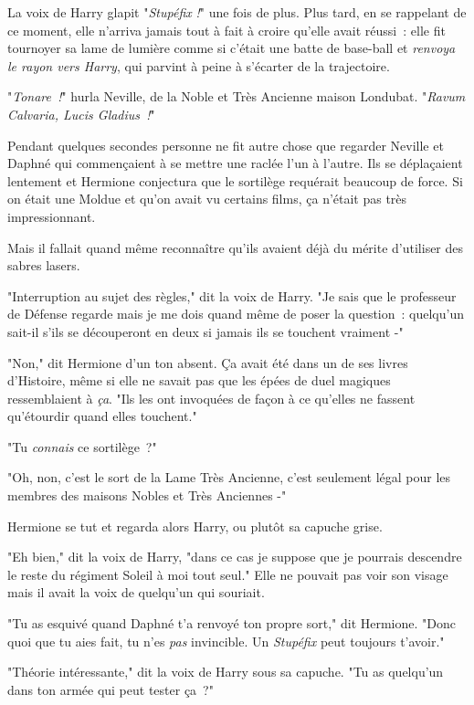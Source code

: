 La voix de Harry glapit "\emph{Stupéfix} \emph{!}" une fois de plus. Plus tard, en se rappelant de ce moment, elle n'arriva jamais tout à fait à croire qu'elle avait réussi~: elle fit tournoyer sa lame de lumière comme si c'était une batte de base-ball et \emph{renvoya le rayon vers Harry}, qui parvint à peine à s'écarter de la trajectoire.

"\emph{Tonare~!}" hurla Neville, de la Noble et Très Ancienne maison Londubat. "\emph{Ravum Calvaria, Lucis Gladius~!}"

\later

Pendant quelques secondes personne ne fit autre chose que regarder Neville et Daphné qui commençaient à se mettre une raclée l'un à l'autre. Ils se déplaçaient lentement et Hermione conjectura que le sortilège requérait beaucoup de force. Si on était une Moldue et qu'on avait vu certains films, ça n'était pas très impressionnant.

Mais il fallait quand même reconnaître qu'ils avaient déjà du mérite d'utiliser des sabres lasers.

"Interruption au sujet des règles," dit la voix de Harry. "Je sais que le professeur de Défense regarde mais je me dois quand même de poser la question~: quelqu'un sait-il s'ils se découperont en deux si jamais ils se touchent vraiment -"

"Non," dit Hermione d'un ton absent. Ça avait été dans un de ses livres d'Histoire, même si elle ne savait pas que les épées de duel magiques ressemblaient à \emph{ça}. "Ils les ont invoquées de façon à ce qu'elles ne fassent qu'étourdir quand elles touchent."

"Tu \emph{connais} ce sortilège~?"

"Oh, non, c'est le sort de la Lame Très Ancienne, c'est seulement légal pour les membres des maisons Nobles et Très Anciennes -"

Hermione se tut et regarda alors Harry, ou plutôt sa capuche grise.

"Eh bien," dit la voix de Harry, "dans ce cas je suppose que je pourrais descendre le reste du régiment Soleil à moi tout seul." Elle ne pouvait pas voir son visage mais il avait la voix de quelqu'un qui souriait.

"Tu as esquivé quand Daphné t'a renvoyé ton propre sort," dit Hermione. "Donc quoi que tu aies fait, tu n'es \emph{pas} invincible. Un \emph{Stupéfix} peut toujours t'avoir."

"Théorie intéressante," dit la voix de Harry sous sa capuche. "Tu as quelqu'un dans ton armée qui peut tester ça~?"

